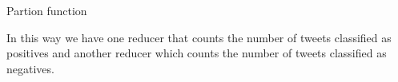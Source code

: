 \documentclass[10pt,twocolumn,letterpaper]{article}
\begin{document}
\begin{algorithm}[H]
\label{PartitionFunction}
\caption{Partion function}
\begin{algorithmic}

        \State {}
    \Else
        \State {}
    \EndIf

\end{algorithmic}
\end{algorithm}

In this way we have one reducer that counts the number of tweets classified as positives and another reducer which counts the number of tweets classified as negatives.
\end{document}
